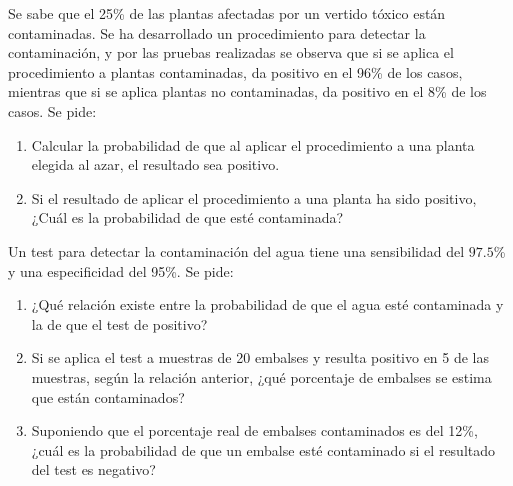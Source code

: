 {Se sabe que el 25\% de las plantas afectadas por un vertido tóxico están contaminadas. Se ha
desarrollado un procedimiento para detectar la contaminación, y por las
pruebas realizadas se observa que si se aplica el procedimiento a plantas contaminadas, da positivo en el 96\% de los casos, mientras que
si se aplica plantas no contaminadas, da positivo en el 8\% de los casos. Se pide:

\begin{enumerate}
\item  Calcular la probabilidad de que al aplicar el procedimiento a una planta elegida al azar, el resultado sea positivo.

\item  Si el resultado de aplicar el procedimiento a una planta ha sido
positivo, ¿Cuál es la probabilidad de que esté contaminada?
\end{enumerate}
}
{}
{}


{Un test para detectar la contaminación del agua tiene una sensibilidad del $97.5$\% y una especificidad del 95\%. Se pide:
\begin{enumerate}
\item ¿Qué relación existe entre la probabilidad de que el agua esté contaminada y la de que el test de positivo?
\item Si se aplica el test a muestras de 20 embalses y resulta positivo en 5 de las muestras, según la relación anterior, ¿qué porcentaje de embalses se estima que están contaminados?
\item Suponiendo que el porcentaje real de embalses contaminados es del 12\%, ¿cuál es la probabilidad de que un embalse esté contaminado si el resultado del test es negativo?
\end{enumerate}
}
{}
{}


